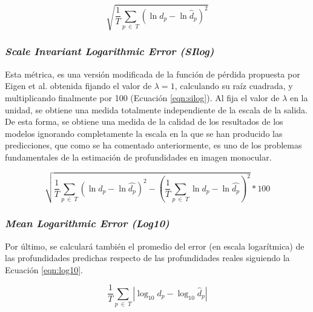 \documentclass[a4paper]{article}
\begin{document}
\begin{equation}
\label{eqn:rmselog}
\sqrt{\frac{1}{T}\sum_{p\ \in\ T} (\ln{d_p} - \ln{\hat{d}_p})^2}
\end{equation}

\subsubsection{\textit{Scale Invariant Logarithmic Error (SIlog)}}
Esta métrica, es una versión modificada de la función de pérdida propuesta por Eigen et al. obtenida fijando el valor de $\lambda = 1$, calculando su raíz cuadrada, y multiplicando finalmente por 100 (Ecuación \ref{eqn:silog}). Al fija el valor de $\lambda$ en la unidad, se obtiene una medida totalmente independiente de la escala de la salida. De esta forma, se obtiene una medida de la calidad de los resultados de los modelos ignorando completamente la escala en la que se han producido las predicciones, que como se ha comentado anteriormente, es uno de los problemas fundamentales de la estimación de profundidades en imagen monocular.

\begin{equation}
\label{eqn:silog}
\sqrt{
	\frac{1}{T} \sum_{p\ \in\ T} (\ln{d_p} - \ln{\hat{d_p}})^2
	-
	{\left(\frac{1}{T} \sum_{p\ \in\ T} \ln{d_p} - \ln{\hat{d_p}}\right)}^2
} * 100
\end{equation}

\subsubsection{\textit{Mean Logarithmic Error (Log10)}}
Por último, se calculará también el promedio del error (en escala logarítmica) de las profundidades predichas respecto de las profundidades reales siguiendo la Ecuación \ref{eqn:log10}.

\begin{equation}
\label{eqn:log10}
\frac{1}{T} \sum_{p\ \in\ T} |\log_{10}{d_p} - \log_{10}{\hat{d}_p}|
\end{equation}
\end{document}
